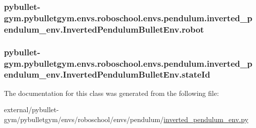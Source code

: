 \subsubsection[{\texorpdfstring{robot}{robot}}]{\setlength{\rightskip}{0pt plus 5cm}pybullet-\/gym.\+pybulletgym.\+envs.\+roboschool.\+envs.\+pendulum.\+inverted\+\_\+pendulum\+\_\+env.\+Inverted\+Pendulum\+Bullet\+Env.\+robot}\hypertarget{classpybullet-gym_1_1pybulletgym_1_1envs_1_1roboschool_1_1envs_1_1pendulum_1_1inverted__pendulum31d47d8094f7022182666018f100e6e7_ac9d893a133a1c75d7338c1657f527345}{}\label{classpybullet-gym_1_1pybulletgym_1_1envs_1_1roboschool_1_1envs_1_1pendulum_1_1inverted__pendulum31d47d8094f7022182666018f100e6e7_ac9d893a133a1c75d7338c1657f527345}
\subsubsection[{\texorpdfstring{state\+Id}{stateId}}]{\setlength{\rightskip}{0pt plus 5cm}pybullet-\/gym.\+pybulletgym.\+envs.\+roboschool.\+envs.\+pendulum.\+inverted\+\_\+pendulum\+\_\+env.\+Inverted\+Pendulum\+Bullet\+Env.\+state\+Id}\hypertarget{classpybullet-gym_1_1pybulletgym_1_1envs_1_1roboschool_1_1envs_1_1pendulum_1_1inverted__pendulum31d47d8094f7022182666018f100e6e7_a401b65abb748d9cf6731784287b9c1e5}{}\label{classpybullet-gym_1_1pybulletgym_1_1envs_1_1roboschool_1_1envs_1_1pendulum_1_1inverted__pendulum31d47d8094f7022182666018f100e6e7_a401b65abb748d9cf6731784287b9c1e5}


The documentation for this class was generated from the following file\+:\begin{DoxyCompactItemize}
\item 
external/pybullet-\/gym/pybulletgym/envs/roboschool/envs/pendulum/\hyperlink{roboschool_2envs_2pendulum_2inverted__pendulum__env_8py}{inverted\+\_\+pendulum\+\_\+env.\+py}\end{DoxyCompactItemize}
